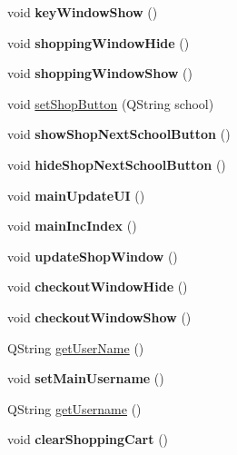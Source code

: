 \begin{DoxyCompactItemize}
\mbox{\label{classwindow_holder_a8492fcdd5346b1b437b5c2671c26ac98}} 
void {\bfseries key\+Window\+Show} ()
\item 
\mbox{\label{classwindow_holder_af2ed7a4ab1231e76da3c757eb1e71423}} 
void {\bfseries shopping\+Window\+Hide} ()
\item 
\mbox{\label{classwindow_holder_aba9de893b828fdd8efdc13e453608948}} 
void {\bfseries shopping\+Window\+Show} ()
\item 
void \hyperlink{classwindow_holder_ab51ad6c3e9cdfd245729fe59958e00ce}{set\+Shop\+Button} (Q\+String school)
\item 
\mbox{\label{classwindow_holder_aae2ea03e3a26645b07076b3b23a3f8e2}} 
void {\bfseries show\+Shop\+Next\+School\+Button} ()
\item 
\mbox{\label{classwindow_holder_a5315d6fbe8abbc60f9821aebeb9c6680}} 
void {\bfseries hide\+Shop\+Next\+School\+Button} ()
\item 
\mbox{\label{classwindow_holder_a4f3d4ae38674aa668e782d2c98d0e325}} 
void {\bfseries main\+Update\+UI} ()
\item 
\mbox{\label{classwindow_holder_ade6b40649d85b1188d1a12ce3f76b7f7}} 
void {\bfseries main\+Inc\+Index} ()
\item 
\mbox{\label{classwindow_holder_ab4bf93b4741176fe4fb38465278227ad}} 
void {\bfseries update\+Shop\+Window} ()
\item 
\mbox{\label{classwindow_holder_abbd6d065957630393a4337acd493070b}} 
void {\bfseries checkout\+Window\+Hide} ()
\item 
\mbox{\label{classwindow_holder_ab302a5831c4e9c65329f3b13afd15911}} 
void {\bfseries checkout\+Window\+Show} ()
\item 
Q\+String \hyperlink{classwindow_holder_a2acbd88adbc48d8e9aef05ce5a692239}{get\+User\+Name} ()
\item 
\mbox{\label{classwindow_holder_a7c7365b2c6cc19052ef677e383c021a3}} 
void {\bfseries set\+Main\+Username} ()
\item 
Q\+String \hyperlink{classwindow_holder_ad152c410bf87d7a04f4fde66253685c2}{get\+Username} ()
\item 
\mbox{\label{classwindow_holder_acff6a10c006a734343dfb67ec6b78249}} 
void {\bfseries clear\+Shopping\+Cart} ()
\end{DoxyCompactItemize}
